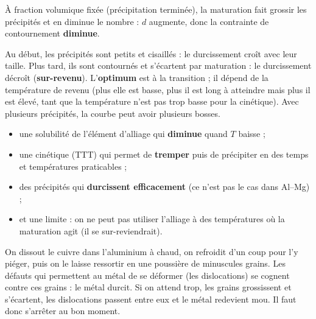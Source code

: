 
À fraction volumique fixée (précipitation terminée), la maturation fait grossir les précipités
et en diminue le nombre : $d$ augmente, donc la contrainte de contournement \textbf{diminue}.


\begin{propbox}[title={Il y a un temps de revenu optimal}]
Au début, les précipités sont petits et cisaillés : le durcissement croît avec leur taille.
Plus tard, ils sont contournés et s'écartent par maturation : le durcissement décroît
(\textbf{sur-revenu}). L'\textbf{optimum} est à la transition ; il dépend de la température de
revenu (plus elle est basse, plus il est long à atteindre mais plus il est élevé, tant que la
température n'est pas trop basse pour la cinétique). Avec plusieurs précipités, la courbe peut
avoir plusieurs bosses.
\end{propbox}

\begin{warnbox}[title=Les conditions pour qu'un alliage soit durcissable]
\begin{itemize}
  \item une solubilité de l'élément d'alliage qui \textbf{diminue} quand $T$ baisse ;
  \item une cinétique (TTT) qui permet de \textbf{tremper} puis de précipiter en des temps et
        températures praticables ;
  \item des précipités qui \textbf{durcissent efficacement} (ce n'est pas le cas dans Al--Mg) ;
  \item et une limite : on ne peut pas utiliser l'alliage à des températures où la maturation
        agit (il se sur-reviendrait).
\end{itemize}
\end{warnbox}

\begin{goatbox}
On dissout le cuivre dans l'aluminium à chaud, on refroidit d'un coup pour l'y piéger, puis on
le laisse ressortir en une poussière de minuscules grains. Les défauts qui permettent au métal de
se déformer (les dislocations) se cognent contre ces grains : le métal durcit. Si on attend
trop, les grains grossissent et s'écartent, les dislocations passent entre eux et le métal
redevient mou. Il faut donc s'arrêter au bon moment.
\end{goatbox}

